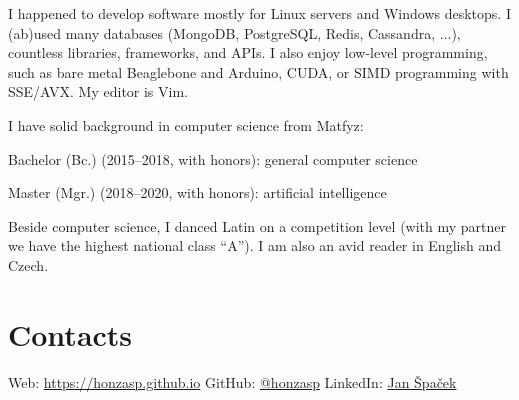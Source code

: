 \documentclass[11pt,a4paper]{article}
\begin{document}
\begin{multicols}{2}
I happened to develop software mostly for Linux servers and Windows desktops. I
(ab)used many databases (MongoDB, PostgreSQL, Redis, Cassandra, ...), countless
libraries, frameworks, and APIs. I also enjoy low-level programming, such as
bare metal Beaglebone and Arduino, CUDA, or SIMD programming with SSE/AVX. My
editor is Vim.

I have solid background in computer science from Matfyz:
\begin{compactitem}
\item Bachelor (Bc.) (2015–2018, with honors): general computer science
\item Master (Mgr.) (2018–2020, with honors): artificial intelligence
\end{compactitem}

Beside computer science, I danced Latin on a competition level (with my partner
we have the highest national class ``A''). I am also an avid reader in English and
Czech.

\section*{Contacts}

Web: \url{https://honzasp.github.io}\newline
GitHub: \href{https://github.com/honzasp}{@honzasp}\newline
LinkedIn: \href{https://www.linkedin.com/in/jan-%C5%A1pa%C4%8Dek-3155b4136/}{Jan
Špaček}\newline

\end{multicols}
\end{document}
